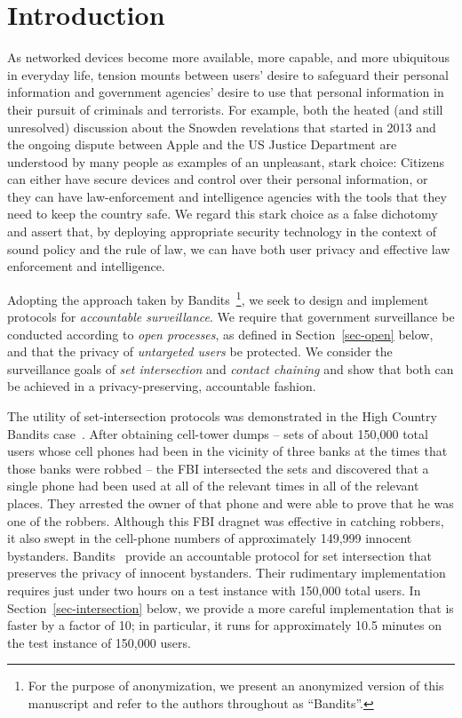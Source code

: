 \section{Introduction}\label{sec-introduction}
As networked devices become more available, more capable, and more ubiquitous
in everyday life, tension mounts between users' desire to safeguard their 
personal information and government agencies' desire to use that personal 
information in their pursuit of criminals and terrorists.  For example, 
both the heated (and still unresolved) discussion about the Snowden 
revelations that started in 2013 and the ongoing dispute between Apple and 
the US Justice Department are understood by many people
as examples of an unpleasant, stark choice: Citizens can either have
secure devices and control over their personal information, or they can have
law-enforcement and intelligence agencies with the tools that they need to
keep the country safe. We regard this stark choice as a false dichotomy and 
assert that, by deploying appropriate security technology in the context of 
sound policy and the rule of law, we can have both user privacy and effective 
law enforcement and intelligence.

Adopting the approach taken by Bandits~\cite{sff-foci2014}\footnote{For the
purpose of anonymization, we present an anonymized version of this manuscript and
refer to the authors throughout as ``Bandits''.}, we
seek to design and implement protocols for {\it accountable surveillance}.
We require that government surveillance be conducted according to {\it open
processes}, as defined in Section~\ref{sec-open} below, and that the privacy
of {\it untargeted users} be protected.  We consider the surveillance goals
of {\it set intersection} and {\it contact chaining} and show that both can 
be achieved in a privacy-preserving, accountable fashion.

The utility of set-intersection protocols was demonstrated in the 
High Country Bandits case~\cite{anderson13cell}.
After obtaining cell-tower dumps -- sets of about 150,000 total users
whose cell phones had been in the vicinity of three banks at the times
that those banks were robbed -- the FBI intersected the sets and discovered 
that a single phone had been used at all of the relevant times in all of the 
relevant places.  They arrested the owner
of that phone and were able to prove that he was one of the robbers.
Although this FBI dragnet was effective in catching robbers, it also swept
in the cell-phone numbers of approximately 149,999 innocent bystanders.
Bandits~\cite{sff-foci2014} provide an accountable protocol for
set intersection that preserves the privacy of innocent bystanders.  Their
rudimentary implementation requires just under two hours on a test instance
with 150,000 total users.  In Section~\ref{sec-intersection} below, we provide
a more careful implementation that is faster by a factor of 10; in particular,
it runs for approximately 10.5 minutes on the test instance of 150,000 users.

